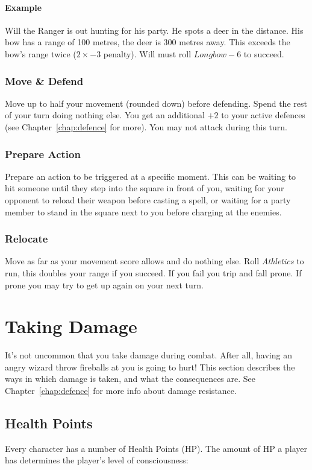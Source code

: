\paragraph{Example} Will the Ranger is out hunting for his party. He spots a deer in the distance. His bow has a range of 100 metres, the deer is 300 metres away. This exceeds the bow's range twice ($2\times -3$ penalty). Will must roll $Longbow-6$ to succeed.

\subsubsection{Move \& Defend}
Move up to half your movement (rounded down) before defending. 
Spend the rest of your turn doing nothing else. 
You get an additional $+2$ to your active defences (see Chapter~\ref{chap:defence} for more). 
You may not attack during this turn.

\subsubsection{Prepare Action}
Prepare an action to be triggered at a specific moment.
This can be waiting to hit someone until they step into the square in front of you, waiting for your opponent to reload their weapon before casting a spell, or waiting for a party member to stand in the square next to you before charging at the enemies.

\subsubsection{Relocate}
Move as far as your movement score allows and do nothing else.
Roll \textit{Athletics} to run, this doubles your range if you succeed.
If you fail you trip and fall prone.
If prone you may try to get up again on your next turn.

\section{Taking Damage}
It's not uncommon that you take damage during combat.
After all, having an angry wizard throw fireballs at you is going to hurt!
This section describes the ways in which damage is taken, and what the consequences are.
See Chapter~\ref{chap:defence} for more info about damage resistance.

\subsection{Health Points}
Every character has a number of Health Points (HP).
The amount of HP a player has determines the player's level of consciousness:

